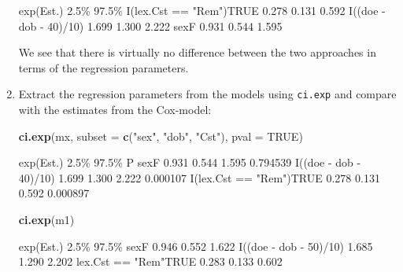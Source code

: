 \documentclass[
]{book}
\newenvironment{Shaded}{\begin{snugshade}}{\end{snugshade}}
\newcommand{\AttributeTok}[1]{\textcolor[rgb]{0.13,0.29,0.53}{#1}}
\newcommand{\ConstantTok}[1]{\textcolor[rgb]{0.56,0.35,0.01}{#1}}
\newcommand{\FunctionTok}[1]{\textcolor[rgb]{0.13,0.29,0.53}{\textbf{#1}}}
\newcommand{\NormalTok}[1]{#1}
\newcommand{\StringTok}[1]{\textcolor[rgb]{0.31,0.60,0.02}{#1}}
\begin{document}
\begin{enumerate}
\begin{Shaded}
\begin{Highlighting}[]
\NormalTok{                        exp(Est.)  2.5\% 97.5\%}
\NormalTok{I(lex.Cst == "Rem")TRUE     0.278 0.131 0.592}
\NormalTok{I((doe {-} dob {-} 40)/10)      1.699 1.300 2.222}
\NormalTok{sexF                        0.931 0.544 1.595}
\end{Highlighting}
\end{Shaded}

  We see that there is virtually no difference between the two
  approaches in terms of the regression parameters.
\item
  Extract the regression parameters from the models using
  \texttt{ci.exp} and compare with the estimates from the Cox-model:

\begin{Shaded}
\begin{Highlighting}[]
\FunctionTok{ci.exp}\NormalTok{(mx, }\AttributeTok{subset =} \FunctionTok{c}\NormalTok{(}\StringTok{"sex"}\NormalTok{, }\StringTok{"dob"}\NormalTok{, }\StringTok{"Cst"}\NormalTok{), }\AttributeTok{pval =} \ConstantTok{TRUE}\NormalTok{)}
\end{Highlighting}
\end{Shaded}

\begin{Shaded}
\begin{Highlighting}[]
\NormalTok{                        exp(Est.)  2.5\% 97.5\%        P}
\NormalTok{sexF                        0.931 0.544 1.595 0.794539}
\NormalTok{I((doe {-} dob {-} 40)/10)      1.699 1.300 2.222 0.000107}
\NormalTok{I(lex.Cst == "Rem")TRUE     0.278 0.131 0.592 0.000897}
\end{Highlighting}
\end{Shaded}

\begin{Shaded}
\begin{Highlighting}[]
\FunctionTok{ci.exp}\NormalTok{(m1)}
\end{Highlighting}
\end{Shaded}

\begin{Shaded}
\begin{Highlighting}[]
\NormalTok{                       exp(Est.)  2.5\% 97.5\%}
\NormalTok{sexF                       0.946 0.552 1.622}
\NormalTok{I((doe {-} dob {-} 50)/10)     1.685 1.290 2.202}
\NormalTok{lex.Cst == "Rem"TRUE       0.283 0.133 0.602}
\end{Highlighting}
\end{Shaded}


\end{enumerate}
\end{document}
